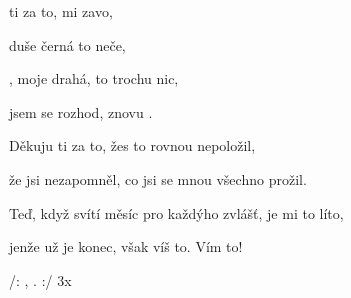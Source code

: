 

\zs
{} ti za to,  mi  zavo,  

 duše černá  to  neče,  

, moje drahá,  to  trochu  nic,  

 jsem se rozhod,   znovu .  
\ks

\zs
Děkuju ti za to, žes to rovnou nepoložil,

že jsi nezapomněl, co jsi se mnou všechno prožil.

Teď, když svítí měsíc pro každýho zvlášť, je mi to líto,

jenže už je konec, však víš to. Vím to!
\ks

\zr
/: ,   .   :/ 3x

\kr

\kp





